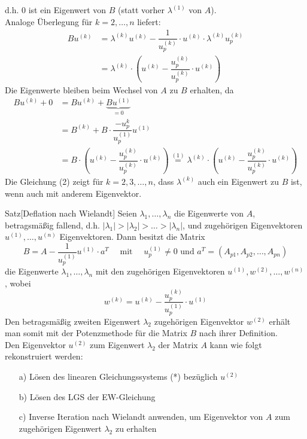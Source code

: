 d.h. $0$ ist ein Eigenwert von $B$  (statt vorher $\lambda^{(1)}$ von $A$).  \\
Analoge Überlegung für $k=2,\dotsc,n$ liefert:
\begin{align*}
    Bu^{(k)} &= \lambda^{(k)}u^{(k)} - \dfrac{1}{u^{(k)}_p} \cdot u^{(k)}\cdot \lambda^{(k)}u^{(k)}_p \\
    &= \lambda^{(k)}\cdot\left(u^{(k)} - \dfrac{u^{(k)}_p}{u^{(k)}_p} \cdot u^{(k)}\right) \tag{1}
\end{align*}
Die Eigenwerte bleiben beim Wechsel von $A$ zu $B$ erhalten, da 
\begin{align*}
    Bu^{(k)} + 0 &= Bu^{(k)} + \underbrace{Bu^{(1)}}_{=0} \\
    &= B^{(k)} + B\cdot\dfrac{-u_p^{k}}{u_p^{(1)}}u^{(1)} \\
    &= B\cdot\left(u^{(k)} - \dfrac{u^{(k)}_p}{u^{(k)}_p} \cdot u^{(k)}\right) 
    \stackrel{(1)}{=} \lambda^{(k)}\cdot\left(u^{(k)} - \dfrac{u^{(k)}_p}{u^{(k)}_p} \cdot u^{(k)}\right) \tag{2}
\end{align*}
Die Gleichung (2) zeigt für $k=2,3,\dotsc,n$, dass $\lambda^{(k)}$ auch ein Eigenwert zu $B$ ist, 
wenn auch mit anderem Eigenvektor. 
\begin{thmbox}{Satz}[Deflation nach Wielandt]
    Seien $\lambda_1,\dotsc,\lambda_n$ die Eigenwerte von $A$, betragsmäßig fallend, d.h. 
    $|\lambda_1|>|\lambda_2|>\dotsc>|\lambda_n|$, und zugehörigen Eigenvektoren $u^{(1)},\dotsc,u^{(n)}$ Eigenvektoren.
    Dann besitzt die Matrix 
    \[B = A - \dfrac{1}{u_p^{(1)}} u^{(1)}\cdot a^T\quad\text{ mit }\quad u_p^{(1)}\neq 0 
    \text{ und } a^T=(A_{p1},A_{p2},\dotsc,A_{pn})\]
    die Eigenwerte $\lambda_1,\dotsc,\lambda_n$ mit den zugehörigen Eigenvektoren $u^{(1)},w^{(2)},\dotsc,w^{(n)}$,
    wobei 
    \[w^{(k)} = u^{(k)} - \dfrac{u_p^{(k)}}{u_p^{(1)}}\cdot u^{(1)}\tag{*}\]
    Den betragsmäßig zweiten Eigenwert $\lambda_2$ zugehörigen Eigenvektor $w^{(2)}$ erhält man somit mit der 
    Potenzmethode für die Matrix $B$ nach ihrer Definition. \\ 
    Den Eigenvektor $u^{(2)}$ zum Eigenwert $\lambda_2$ der Matrix $A$ kann wie folgt rekonstruiert werden:
    \begin{enumerate}
        \item[a)] Lösen des linearen Gleichungssystems (*) bezüglich $u^{(2)}$ 
        \item[b)] Lösen des LGS der EW-Gleichung  
        \item[c)] Inverse Iteration nach Wielandt anwenden, um Eigenvektor von $A$ zum zugehörigen Eigenwert
        $\lambda_2$ zu erhalten 
    \end{enumerate}
\end{thmbox}
